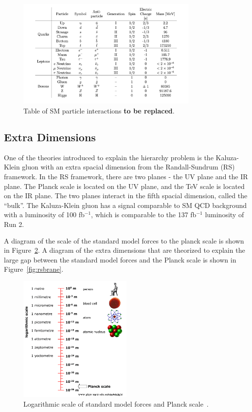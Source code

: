  \begin{figure}[h!]
\centering
\includegraphics[width=0.8\textwidth]{figures/sm_table.png}
\caption{Table of SM particle interactions \textbf{to be replaced}.}
\label{fig:smtable}
\end{figure}





\subsection{Extra Dimensions}

One of the theories introduced to explain the hierarchy problem is the Kaluza-Klein gluon with an extra spacial dimension from the Randall-Sundrum (RS) framework. In the RS framework, there are two planes - the UV plane and the IR plane. The Planck scale is located on the UV plane, and the TeV scale is located on the IR plane. The two planes interact in the fifth spacial dimension, called the “bulk”. The Kaluza-Klein gluon has a signal comparable to SM QCD background with a luminosity of 100 fb$^{-1}$, which is comparable to the 137 fb$^{-1}$ luminosity of Run 2.

A diagram of the scale of the standard model forces to the planck scale is shown in Figure~\ref{fig:planck}. A diagram of the extra dimensions that are theorized to explain the large gap between the standard model forces and the Planck scale is shown in Figure~\ref{fig:rsbrane}.

\begin{figure}[h]
	\centering
	\includegraphics[width=0.5\textwidth]{figures/Planck_scale.png}
	\caption{Logarithmic scale of standard model forces and Planck scale~\cite{Planck_scale}.}
	\label{fig:planck}
\end{figure}

